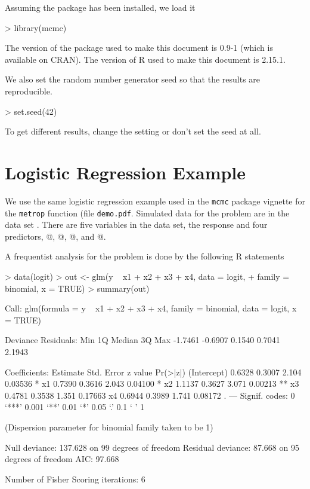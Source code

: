 \documentclass[11pt]{article}
\begin{document}
Assuming the \verb@mcmc@ package has been installed, we load it
\begin{Schunk}
\begin{Sinput}
> library(mcmc)
\end{Sinput}
\end{Schunk}
The version of the package used to make this document
is 0.9-1 (which is available on CRAN).
The version of R used to make this document is 2.15.1.

We also set the random number generator seed so that the results are
reproducible.
\begin{Schunk}
\begin{Sinput}
> set.seed(42)
\end{Sinput}
\end{Schunk}
To get different results, change the setting or don't set the seed at all.

\section{Logistic Regression Example}

We use the same logistic regression example used in the \texttt{mcmc}
package vignette for the \texttt{metrop} function (file \texttt{demo.pdf}.
Simulated data for the problem are in the data set \verb@logit@.
There are five variables in the data set, the response \verb@y@
and four predictors, @, @, @, and @.

A frequentist analysis for the problem is done by the following R statements
\begin{Schunk}
\begin{Sinput}
> data(logit)
> out <- glm(y ~ x1 + x2 + x3 + x4, data = logit,
+     family = binomial, x = TRUE)
> summary(out)
\end{Sinput}
\begin{Soutput}
Call:
glm(formula = y ~ x1 + x2 + x3 + x4, family = binomial, data = logit, 
    x = TRUE)

Deviance Residuals: 
    Min       1Q   Median       3Q      Max  
-1.7461  -0.6907   0.1540   0.7041   2.1943  

Coefficients:
            Estimate Std. Error z value Pr(>|z|)   
(Intercept)   0.6328     0.3007   2.104  0.03536 * 
x1            0.7390     0.3616   2.043  0.04100 * 
x2            1.1137     0.3627   3.071  0.00213 **
x3            0.4781     0.3538   1.351  0.17663   
x4            0.6944     0.3989   1.741  0.08172 . 
---
Signif. codes:  0 ‘***’ 0.001 ‘**’ 0.01 ‘*’ 0.05 ‘.’ 0.1 ‘ ’ 1 

(Dispersion parameter for binomial family taken to be 1)

    Null deviance: 137.628  on 99  degrees of freedom
Residual deviance:  87.668  on 95  degrees of freedom
AIC: 97.668

Number of Fisher Scoring iterations: 6
\end{Soutput}
\end{Schunk}
\end{document}
